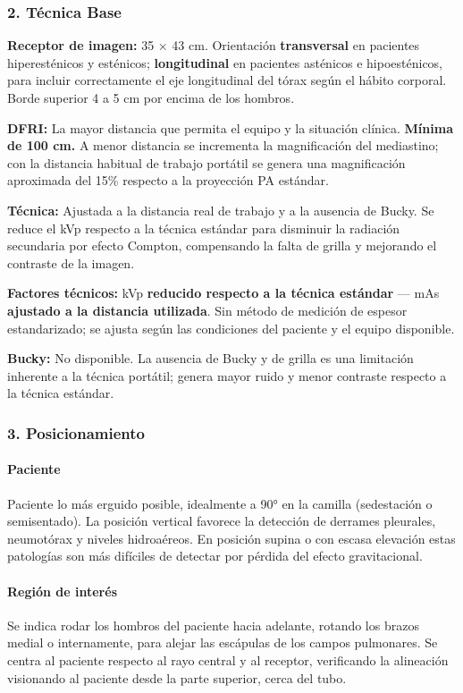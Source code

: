 	\subsubsection*{2. Técnica Base}
	
	\textbf{Receptor de imagen:} 35 × 43 cm. Orientación \textbf{transversal} en pacientes hiperesténicos y esténicos; \textbf{longitudinal} en pacientes asténicos e hipoesténicos, para incluir correctamente el eje longitudinal del tórax según el hábito corporal. Borde superior 4 a 5 cm por encima de los hombros.
	
	\textbf{DFRI:} La mayor distancia que permita el equipo y la situación clínica. \textbf{Mínima de 100 cm.} A menor distancia se incrementa la magnificación del mediastino; con la distancia habitual de trabajo portátil se genera una magnificación aproximada del 15\% respecto a la proyección PA estándar.
	
	\textbf{Técnica:} Ajustada a la distancia real de trabajo y a la ausencia de Bucky. Se reduce el kVp respecto a la técnica estándar para disminuir la radiación secundaria por efecto Compton, compensando la falta de grilla y mejorando el contraste de la imagen.
	
	\textbf{Factores técnicos:} kVp \textbf{reducido respecto a la técnica estándar} --- mAs \textbf{ajustado a la distancia utilizada}. Sin método de medición de espesor estandarizado; se ajusta según las condiciones del paciente y el equipo disponible.
	
	\textbf{Bucky:} No disponible. La ausencia de Bucky y de grilla es una limitación inherente a la técnica portátil; genera mayor ruido y menor contraste respecto a la técnica estándar.
	
	\subsubsection*{3. Posicionamiento}
	
	\paragraph{Paciente}
	Paciente lo más erguido posible, idealmente a 90° en la camilla (sedestación o semisentado). La posición vertical favorece la detección de derrames pleurales, neumotórax y niveles hidroaéreos. En posición supina o con escasa elevación estas patologías son más difíciles de detectar por pérdida del efecto gravitacional.

	\paragraph{Región de interés}
	Se indica rodar los hombros del paciente hacia adelante, rotando los brazos medial o internamente, para alejar las escápulas de los campos pulmonares. Se centra al paciente respecto al rayo central y al receptor, verificando la alineación visionando al paciente desde la parte superior, cerca del tubo.


